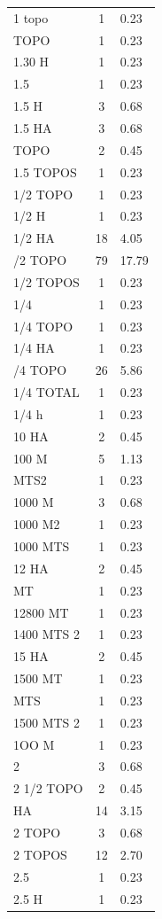 \documentclass{article}\usepackage[]{graphicx}\usepackage[table]{xcolor}
\begin{document}
\begin{table}[H]
\begin{tabular}{lcl}
1 topo & 1 & 0.23\\
\addlinespace
1.2 TOPO & 1 & 0.23\\
1.30 H & 1 & 0.23\\
1.5 & 1 & 0.23\\
1.5 H & 3 & 0.68\\
1.5 HA & 3 & 0.68\\
\addlinespace
1.5 TOPO & 2 & 0.45\\
1.5 TOPOS & 1 & 0.23\\
1/2  TOPO & 1 & 0.23\\
1/2 H & 1 & 0.23\\
1/2 HA & 18 & 4.05\\
\addlinespace
1/2 TOPO & 79 & 17.79\\
1/2 TOPOS & 1 & 0.23\\
1/4 & 1 & 0.23\\
1/4  TOPO & 1 & 0.23\\
1/4 HA & 1 & 0.23\\
\addlinespace
1/4 TOPO & 26 & 5.86\\
1/4 TOTAL & 1 & 0.23\\
1/4 h & 1 & 0.23\\
10 HA & 2 & 0.45\\
100 M & 5 & 1.13\\
\addlinespace
100 MTS2 & 1 & 0.23\\
1000 M & 3 & 0.68\\
1000 M2 & 1 & 0.23\\
1000 MTS & 1 & 0.23\\
12 HA & 2 & 0.45\\
\addlinespace
1200 MT & 1 & 0.23\\
12800 MT & 1 & 0.23\\
1400 MTS 2 & 1 & 0.23\\
15 HA & 2 & 0.45\\
1500 MT & 1 & 0.23\\
\addlinespace
1500 MTS & 1 & 0.23\\
1500 MTS 2 & 1 & 0.23\\
1OO M & 1 & 0.23\\
2 & 3 & 0.68\\
2 1/2 TOPO & 2 & 0.45\\
\addlinespace
2 HA & 14 & 3.15\\
2 TOPO & 3 & 0.68\\
2 TOPOS & 12 & 2.70\\
2.5 & 1 & 0.23\\
2.5 H & 1 & 0.23\\

\end{tabular}
\end{table}
\end{document}
